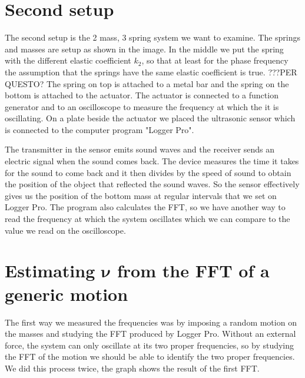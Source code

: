 \documentclass{article}
\begin{document}
\section{Second setup} \label{sec:setup2}
The second setup is the 2 mass, 3 spring system we want to examine. The springs and masses are setup as shown in the image. 
In the middle we put the spring with the different elastic coefficient $k_2$, so that at least for the phase frequency the assumption that the springs have the same elastic coefficient is true. ???PER QUESTO?
The spring on top is attached to a metal bar and the spring on the bottom is attached to the actuator. The actuator is connected to a function generator and to an oscilloscope to measure the frequency at which the it is oscillating. On a plate beside the actuator we placed the ultrasonic sensor which is connected to the computer program "Logger Pro". 

The transmitter in the sensor emits sound waves and the receiver sends an electric signal when the sound comes back. The device measures the time it takes for the sound to come back and it then divides by the speed of sound to obtain the position of the object that reflected the sound waves. So the sensor effectively gives us the position of the bottom mass at regular intervals that we set on Logger Pro. The program also calculates the FFT, so we have another way to read the frequency at which the system oscillates which we can compare to the value we read on the oscilloscope. 


\section{Estimating $\bm \nu$ from the FFT of a generic motion}
The first way we measured the frequencies was by imposing a random motion on the masses and studying the FFT produced by Logger Pro. Without an external force, the system can only oscillate at its two proper frequencies, so by studying the FFT of the motion we should be able to identify the two proper frequencies. We did this process twice, the graph shows the result of the first FFT. 
\end{document}
